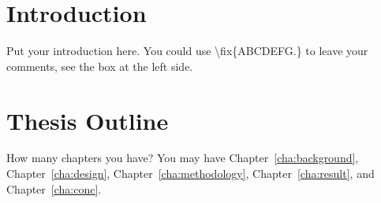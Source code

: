 \section{Introduction}
\label{sec:problemstatement}
Put your introduction here. You could use \textbackslash fix\{ABCDEFG.\} to
leave your comments, see the box at the left side.  



\section{Thesis Outline}
\label{sec:outline}
How many chapters you have? You may have Chapter~\ref{cha:background},
Chapter~\ref{cha:design}, Chapter~\ref{cha:methodology},
Chapter~\ref{cha:result}, and Chapter~\ref{cha:conc}.
